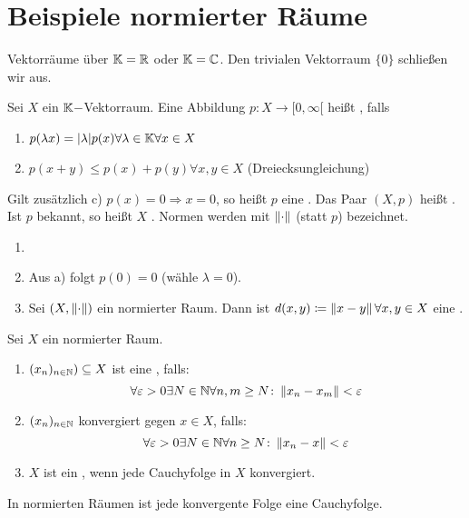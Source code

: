 \chapter{Beispiele normierter R\"aume}
Vektorr\"aume \"uber $ \mathbb{K}=\mathbb{R} $ oder $ \mathbb{K}=\mathbb{C} $. Den trivialen Vektorraum $ \lbrace 0\rbrace $ schlie\ss en wir aus.
\begin{definition}
Sei $ X $ ein $ \mathbb{K}- $Vektorraum. Eine Abbildung $ p\colon X\rightarrow[0,\infty[ $ hei\ss t , falls
\begin{enumerate}
\item[a)] $ p(\lambda x)=|\lambda|p(x)\forall\lambda\in\mathbb{K}\forall x\in X $
\item[b)] $ p(x+y)\leq p(x)+p(y)\forall x,y\in X $ (Dreiecksungleichung)
\end{enumerate}
Gilt zus\"atzlich c) $ p(x)=0\Rightarrow x=0 $, so hei\ss t $ p $ eine . Das Paar $ (X,p) $ hei\ss t .\\
Ist $ p $ bekannt, so hei\ss t $ X $ . Normen werden mit $ \left\|\cdot\right\| $ (statt $ p $) bezeichnet.
\end{definition}
\begin{bemerkung*}
\begin{enumerate}
\item[]
\item Aus a) folgt $ p(0)=0 $ (w\"ahle $ \lambda=0 $).
\item Sei $ (X,\left\|\cdot\right\|) $ ein normierter Raum. Dann ist $ d(x,y)\coloneqq\left\|x-y\right\|\forall x,y\in X $ eine .
\end{enumerate}
\end{bemerkung*}
\newpage
\begin{definition}
Sei $ X $ ein normierter Raum.
\begin{enumerate}
\item[a)] $ (x_n)_{n\in\mathbb{N}})\subseteq X $ ist eine , falls:
\[ \forall\varepsilon>0\exists N\in\mathbb{N}\forall n,m\geq N\colon\left\|x_n-x_m\right\|<\varepsilon \]
\item[b)] $ (x_n)_{n\in\mathbb{N}} $ konvergiert gegen $ x\in X $, falls:
\[ \forall\varepsilon>0\exists N\in\mathbb{N}\forall n\geq N\colon\left\|x_n-x\right\|<\varepsilon \]
\item[c)] $ X $ ist ein , wenn jede Cauchyfolge in $ X $ konvergiert.
\end{enumerate}
\end{definition}
\begin{bemerkung*}
In normierten R\"aumen ist jede konvergente Folge eine Cauchyfolge.
\end{bemerkung*}
